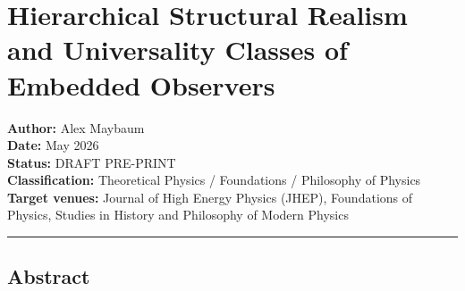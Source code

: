 \documentclass[
]{article}
\author{}
\date{}
\begin{document}
\hypertarget{hierarchical-structural-realism-and-universality-classes-of-embedded-observers}{%
\section{Hierarchical Structural Realism and Universality Classes of
Embedded
Observers}\label{hierarchical-structural-realism-and-universality-classes-of-embedded-observers}}

\textbf{Author:} Alex Maybaum\\
\textbf{Date:} May 2026\\
\textbf{Status:} DRAFT PRE-PRINT\\
\textbf{Classification:} Theoretical Physics / Foundations / Philosophy
of Physics\\
\textbf{Target venues:} Journal of High Energy Physics (JHEP),
Foundations of Physics, Studies in History and Philosophy of Modern
Physics

\begin{center}\rule{0.5\linewidth}{0.5pt}\end{center}

\hypertarget{abstract}{%
\subsection{Abstract}\label{abstract}}
\end{document}
